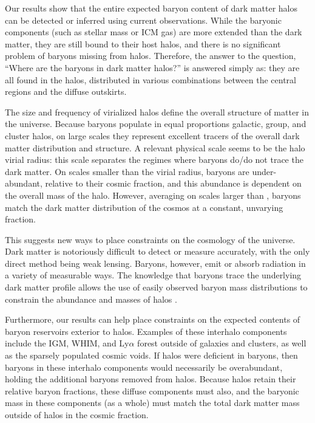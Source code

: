 Our results show that the entire expected baryon content of dark
matter halos can be detected or inferred using current
observations. While the baryonic components (such as stellar mass or
ICM gas) are more extended than the dark matter, they are still bound
to their host halos, and there is no significant problem of baryons
missing from halos. Therefore, the answer to the question, ``Where are
the baryons in dark matter halos?'' is answered simply as: they are
all found in the halos, distributed in various combinations between
the central regions and the diffuse outskirts. 

The size and frequency of virialized halos define the overall
structure of matter in the universe. Because baryons populate in equal
proportions galactic, group, and cluster halos, on large scales they
represent excellent tracers of the overall dark matter distribution
and structure. A relevant physical scale seems to be the halo virial
radius: this scale separates the regimes where baryons do/do not trace
the dark matter. On scales smaller than the virial radius, baryons are
under-abundant, relative to their cosmic fraction, and this abundance
is dependent on the overall mass of the halo. However, averaging on
scales larger than \rvir{}, baryons match the dark matter distribution
of the cosmos at a constant, unvarying fraction. 

This suggests new ways to place constraints on the cosmology of the
universe. Dark matter is notoriously difficult to detect or measure
accurately, with the only direct method being weak lensing. Baryons,
however, emit or absorb radiation in a variety of measurable
ways. The knowledge that baryons trace the underlying dark matter
profile allows the use of easily observed baryon mass distributions to
constrain the abundance and masses of halos . 

Furthermore, our results can help place constraints on the expected
contents of baryon reservoirs exterior to halos. Examples of these
interhalo components include the IGM, WHIM, and Ly$\alpha$ forest
outside of galaxies and clusters, as well as the sparsely populated
cosmic voids. If halos were deficient in baryons, then baryons in
these interhalo components would necessarily be overabundant, holding
the additional baryons removed from halos. Because halos retain their
relative baryon fractions, these diffuse components must also, and the
baryonic mass in these components (as a whole) must match the total
dark matter mass outside of halos in the cosmic fraction. 

